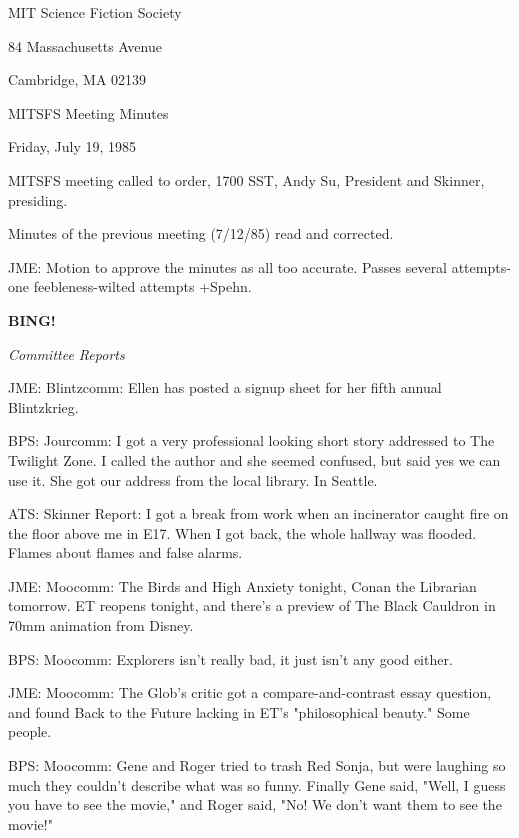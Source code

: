 \documentclass[12pt]{article}
\newcommand{\bing}{{\bf BING!} }
\newcommand{\goto}[1]{\bing \vskip 12pt \centerline{{\em{#1}}}}
\begin{document}
\begin{center}

MIT Science Fiction Society 

84 Massachusetts Avenue

Cambridge, MA 02139

\vspace{12pt}

MITSFS Meeting Minutes 

Friday, July 19, 1985

\end{center}
 
\vspace{18pt}

\setlength{\parskip}{6pt}

\noindent
MITSFS meeting called to order, 1700 SST,
Andy Su, President and Skinner, presiding.

Minutes of the previous meeting (7/12/85) read and corrected.

JME: Motion to approve the minutes as all too accurate. Passes several attempts-one feebleness-wilted attempts +Spehn.

\goto{Committee Reports}

JME: Blintzcomm: Ellen has posted a signup sheet for her fifth annual Blintzkrieg.

BPS: Jourcomm: I got a very professional looking short story addressed to The Twilight Zone. I called the author and she seemed confused, but said yes we can use it. She got our address from the local library. In Seattle.

ATS: Skinner Report: I got a break from work when an incinerator caught fire on the floor above me in E17. When I got back, the whole hallway was flooded. Flames about flames and false alarms.

JME: Moocomm: The Birds and High Anxiety tonight, Conan the Librarian tomorrow. ET reopens tonight, and there's a preview of The Black Cauldron in 70mm animation from Disney.

BPS: Moocomm: Explorers isn't really bad, it just isn't any good either.

JME: Moocomm: The Glob's critic got a compare-and-contrast essay question, and found Back to the Future lacking in ET's "philosophical beauty." Some people.

BPS: Moocomm: Gene and Roger tried to trash Red Sonja, but were laughing so much they couldn't describe what was so funny. Finally Gene said, "Well, I guess you have to see the movie," and Roger said, "No! We don't want them to see the movie!"
\end{document}
